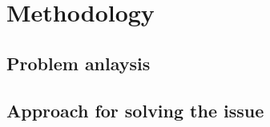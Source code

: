 \chapter{Methodology}
\label{mainone}
\section{Problem anlaysis}

\section{Approach for solving the issue}